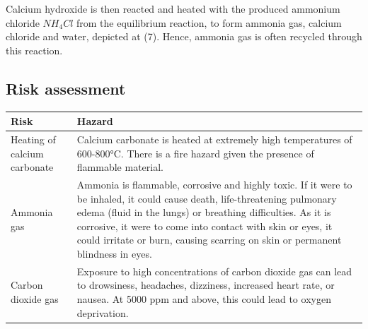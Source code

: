 \documentclass[12pt, a4paper]{article}
\begin{document}
Calcium hydroxide is then reacted and heated with the produced ammonium chloride \(NH_{4}Cl\) from the equilibrium reaction, to form ammonia gas, calcium chloride and water, depicted at (7). Hence, ammonia gas is often recycled through this reaction.



\subsection{Risk assessment}

\begin{table}[H]
	\centering
\begin{tabular}{|p{5cm}|p{12cm}|}
	\hline
\textbf{Risk}                    & \textbf{Hazard}                                                                                                                                                                                                                                                                                                                                                                                                   \\  \hline
Heating of calcium carbonate     & Calcium carbonate is heated at extremely high temperatures of 600-800°C. There is a fire hazard given the presence of flammable material.                                                                                                                                                                                                                                                                        \\  \hline
Ammonia gas                      & Ammonia is flammable, corrosive and highly toxic. If it were to be inhaled, it could cause death, life-threatening pulmonary edema (fluid in the lungs) or breathing difficulties. As it is corrosive, it were to come into contact with skin or eyes, it could irritate or burn, causing scarring on skin or permanent blindness in eyes.                                                                        \\  \hline
Carbon dioxide gas               & Exposure to high concentrations of carbon dioxide gas can lead to drowsiness, headaches, dizziness, increased heart rate, or nausea. At 5000 ppm and above, this could lead to oxygen deprivation.                                                                                                                                                                                                                \\  \hline

\end{tabular}
\end{table}
\end{document}
